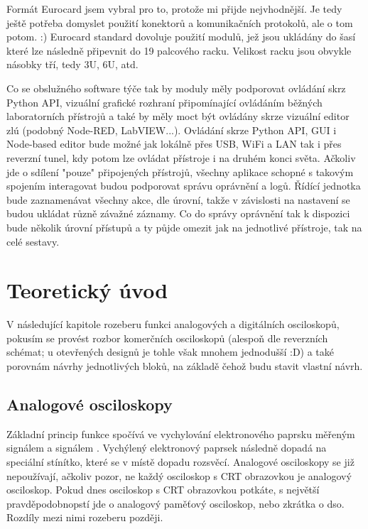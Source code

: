 \documentclass[12pt]{article}
\begin{document}
Formát Eurocard jsem vybral pro to, protože mi přijde nejvhodnější.
Je tedy ještě potřeba domyslet použití konektorů a komunikačních protokolů,
ale o tom potom. :) Eurocard standard dovoluje použití modulů, jež jsou
ukládány do šasí které lze následně připevnit do 19 palcového racku. Velikost
racku jsou obvykle násobky tří, tedy 3U, 6U, atd.

Co se obslužného software týče tak by moduly měly podporovat ovládání
skrz Python API, vizuální grafické rozhraní připomínající ovládáním běžných
laboratorních přístrojů a také by měly moct být ovládány skrze vizuální editor 
zlú (podobný Node-RED, LabVIEW...). Ovládání skrze Python API, GUI i Node-based editor
bude možné jak lokálně přes USB, WiFi a LAN tak i přes reverzní tunel, kdy potom
lze ovládat přístroje i na druhém konci světa. Ačkoliv jde o sdílení "pouze" připojených
přístrojů, všechny aplikace schopné s takovým spojením interagovat budou podporovat
správu oprávnění a logů. Řídící jednotka bude zaznamenávat všechny akce, dle úrovní,
takže v závislosti na nastavení se budou ukládat různě závažné záznamy. Co do správy
oprávnění tak k dispozici bude několik úrovní přístupů a ty půjde omezit jak na
jednotlivé přístroje, tak na celé sestavy.

\newpage

\section{Teoretický úvod}

V následující kapitole rozeberu funkci analogových a digitálních osciloskopů, pokusím
se provést rozbor komerčních osciloskopů (alespoň dle reverzních schémat; u 
otevřených designů je tohle však mnohem jednodušší :D) a také porovnám
návrhy jednotlivých bloků, na základě čehož budu stavit vlastní návrh.

\subsection{Analogové osciloskopy} \label{sec:analog-osci}

Základní princip funkce spočívá ve vychylování elektronového paprsku měřeným
signálem a signálem . Vychýlený elektronový paprsek následně
dopadá na speciální stínítko, které se v místě dopadu rozsvěcí. Analogové
osciloskopy se již nepoužívají, ačkoliv pozor, ne každý osciloskop s CRT obrazovkou
je analogový osciloskop. Pokud dnes osciloskop s CRT obrazovkou potkáte,
s největší pravděpodobnopstí jde o analogový paměťový osciloskop, nebo zkrátka
o \acrfull{dso}. Rozdíly mezi nimi rozeberu později.
\end{document}
